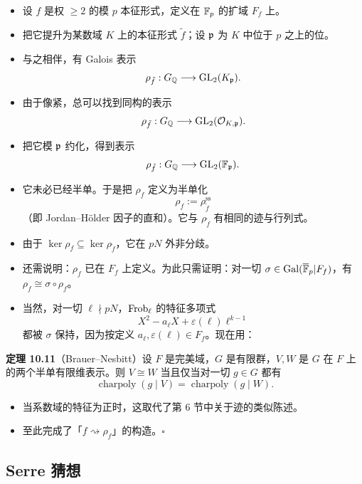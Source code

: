\begin{itemize}
\item 设 $f$ 是权 $\ge 2$ 的模 $p$ 本征形式，定义在 $\mathbb{F}_p$ 的扩域 $F_f$ 上。
\item 把它提升为某数域 $K$ 上的本征形式 $\tilde f$；设 $\mathfrak{p}$ 为 $K$ 中位于 $p$ 之上的位。
\item 与之相伴，有 Galois 表示
\[
\rho_{\tilde f}:G_{\mathbb{Q}}\longrightarrow\operatorname{GL}_2(K_{\mathfrak{p}}).
\]
\item 由于像紧，总可以找到同构的表示
\[
\rho_{\tilde f}:G_{\mathbb{Q}}\longrightarrow\operatorname{GL}_2(\mathcal{O}_{K,\mathfrak{p}}).
\]
\item 把它模 $\mathfrak{p}$ 约化，得到表示
\[
\rho_{\tilde f}:G_{\mathbb{Q}}\longrightarrow\operatorname{GL}_2(\mathbb{F}_{\mathfrak{p}}).
\]
\item 它未必已经半单。于是把 $\rho_f$ 定义为半单化
\[
\rho_f:=\rho_{\tilde f}^{\mathrm{ss}}
\]
（即 Jordan--Hölder 因子的直和）。它与 $\rho_{\tilde f}$ 有相同的迹与行列式。
\item 由于 $\ker\rho_f\subseteq\ker\rho_{\tilde f}$，它在 $pN$ 外非分歧。
\item 还需说明：$\rho_f$ 已在 $F_f$ 上定义。为此只需证明：对一切 $\sigma\in\operatorname{Gal}(\overline{\mathbb{F}}_p|F_f)$，有 $\rho_f\cong\sigma\circ\rho_f$。
\item 当然，对一切 $\ell\nmid pN$，$\operatorname{Frob}_\ell$ 的特征多项式
\[
X^2-a_\ell X+\varepsilon(\ell)\ell^{k-1}
\]
都被 $\sigma$ 保持，因为按定义 $a_\ell,\varepsilon(\ell)\in F_f$。现在用：
\end{itemize}

\noindent\textbf{定理 10.11}（Brauer--Nesbitt）\label{thm:10.11}\quad 设 $F$ 是完美域，$G$ 是有限群，$V,W$ 是 $G$ 在 $F$ 上的两个半单有限维表示。则 $V\cong W$ 当且仅当对一切 $g\in G$ 都有
\[
\operatorname{charpoly}(g\mid V)=\operatorname{charpoly}(g\mid W).
\]

\begin{itemize}
\item 当系数域的特征为正时，这取代了第 6 节中关于迹的类似陈述。
\item 至此完成了「$f\rightsquigarrow\rho_f$」的构造。\hfill$\square$
\end{itemize}

\subsection*{Serre 猜想}

